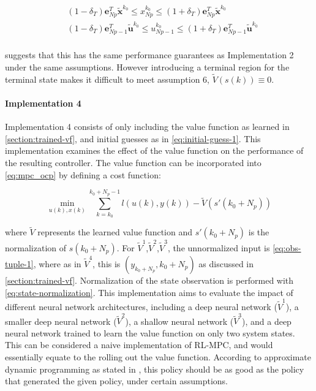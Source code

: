 \begin{equation}\label{eq:terminal-constraint-ocp}
	\begin{aligned}
		& (1-\delta_T)\mathbf{e}_{Np}^T \tilde{\mathbf{x}}^{k_0} \leq x^{k_0}_{Np} \leq (1+\delta_T)\mathbf{e}_{Np}^T \tilde{\mathbf{x}}^{k_0}\\
		&(1-\delta_T)\mathbf{e}_{Np-1}^T\tilde{\mathbf{u}}^{k_0} \leq u^{k_0}_{Np-1} \leq (1+\delta_T) \mathbf{e}_{Np-1}^T\tilde{\mathbf{u}}^{k_0}\\
	\end{aligned}
\end{equation}

\cite{amritEconomicOptimizationUsing2011} suggests that this has the same performance guarantees as Implementation 2 under the same assumptions. However introducing a terminal region for the terminal state makes it difficult to meet assumption 6, $\tilde{V}(s(k)) \equiv 0$. 

\paragraph{Implementation 4}
Implementation 4 consists of only including the value function as learned in \autoref{section:trained-vf}, and initial guesses as in \autoref{eq:initial-guess-1}. This implementation examines the effect of the value function on the performance of the resulting controller. The value function can be incorporated into \autoref{eq:mpc_ocp} by defining a cost function:

\begin{equation}\label{eq:cost-function}
		\min_{u(k),x(k)}  \sum_{k = k_0}^{k_0 + N_p - 1}{l(u(k), y(k))} - \tilde{V}(s'(k_0 + N_p))
\end{equation}

where $\tilde{V}$ represents the learned value function and $s'(k_0+N_p)$ is the normalization of $s(k_0+N_p)$. For $\tilde{V}^1$,$\tilde{V}^2$,$\tilde{V}^3$, the unnormalized input is \autoref{eq:obs-tuple-1}, where as in $\tilde{V}^4$, this is $(y_{k_0+N_p},k_0+N_p)$ as discussed in \autoref{section:trained-vf}. Normalization of the state observation is performed with \autoref{eq:state-normalization}. This implementation aims to evaluate the impact of different neural network architectures, including a deep neural network ($\tilde{V}^1$), a smaller deep neural network ($\tilde{V}^2$), a shallow neural network ($\tilde{V}^3$), and a deep neural network trained to learn the value function on only two system states. This can be considered a naive implementation of RL-MPC, and would essentially equate to the rolling out the value function. According to approximate dynamic programming as stated in \cite{bertsekasLessonsAlphaZeroOptimal}, this policy should be as good as the policy that generated the given policy, under certain assumptions. 

